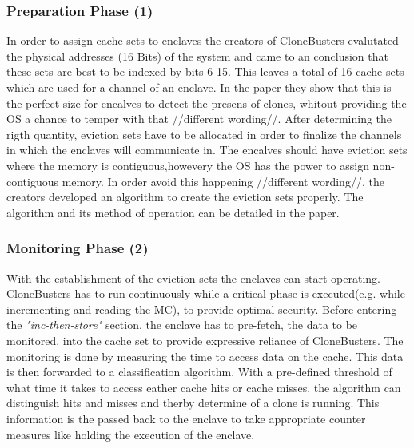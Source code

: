 \subsubsection{Preparation Phase (1)}
In order to assign cache sets to enclaves the creators of CloneBusters evalutated the physical addresses (16 Bits) of the system and came to an conclusion that these sets are best to be indexed by bits 6-15. This leaves a total of 16 cache sets which are used for a channel of an enclave. In the paper they show that this is the perfect size for encalves to detect the presens of clones, whitout providing the OS a chance to temper with that //different wording//. 
After determining the rigth quantity, eviction sets have to be allocated in order to finalize the channels in which the enclaves will communicate in. The encalves should have eviction sets where the memory is contiguous,howevery the OS has the power to assign non-contiguous memory. In order avoid this happening //different wording//, the creators developed an algorithm to create the eviction sets properly. The algorithm and its method of operation can be detailed in the paper.

\subsubsection{Monitoring Phase (2)}
With the establishment of the eviction sets the enclaves can start operating. CloneBusters has to run continuously while a critical phase is executed(e.g. while incrementing and reading the MC), to provide optimal security. Before entering the \textit{"inc-then-store"} section, the enclave has to pre-fetch, the data to be monitored, into the cache set to provide expressive reliance of CloneBusters. 
The monitoring is done by measuring the time to access data on the cache. This data is then forwarded to a classification algorithm. With a pre-defined threshold of what time it takes to access eather cache hits or cache misses, the algorithm can  distinguish hits and misses and therby determine of a clone is running. This information is the passed back to the enclave to take appropriate counter measures like holding the execution of the enclave.
